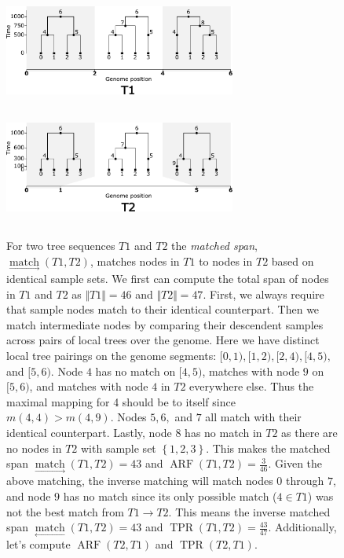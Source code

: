 \documentclass[10pt,twoside,lineno]{gsajnl}
\newcommand{\match}{\underset{\longrightarrow}{\operatorname{match}}}
\newcommand{\invmatch}{\underset{\longleftarrow}{\operatorname{match}}}
\begin{document}
\begin{figure}[!ht]
	\begin{center}
\includegraphics[height=1.5in, width=3in]{figures/discrepancy_func_method_t1.pdf}
\includegraphics[height=1.5in, width=3in]{figures/discrepancy_function_method_t2.pdf}
    \caption{
        For two tree sequences $T1$ and $T2$ the \emph{matched span}, $\match(T1,T2)$, matches nodes in $T1$ to nodes in $T2$
        based on identical sample sets. We first can compute the total span of nodes in $T1$ and $T2$ as $\Vert T1\Vert = 46$ and $\Vert T2\Vert = 47$.
        First, we always require that sample nodes match to their identical counterpart. Then we match intermediate nodes by comparing their
        descendent samples across pairs of local trees over the genome. Here we have distinct local tree pairings on the genome segments:
        $[0,1), [1,2), [2,4), [4,5),$ and $[5,6)$.
        Node $4$ has no match on $[4,5)$, matches with node $9$ on $[5,6)$, and matches with node $4$ in $T2$ everywhere else. 
        Thus the maximal mapping for 4 should be to itself since $m(4,4) > m(4,9)$. 
        Nodes $5, 6,$ and $7$ all match with their identical counterpart.
        Lastly, node $8$ has no match in $T2$ as there are no nodes in $T2$ with sample set $\left\{1,2,3\right\}$.
        This makes the matched span $\match(T1,T2)=43$ and $\operatorname{ARF}(T1,T2)=\frac{3}{46}$.
        Given the above matching, the inverse matching will match nodes $0$ through $7$, and node $9$ has no match 
        since its only possible match ($4 \in T1$) was not the best match from $T1 \to T2$. 
        This means the inverse matched span $\invmatch(T1,T2)=43$ and $\operatorname{TPR}(T1,T2)=\frac{43}{47}$.\newline
        Additionally, let's compute $\operatorname{ARF}(T2,T1)$ and $\operatorname{TPR}(T2,T1)$.
}
\end{center}
\end{figure}
\end{document}
